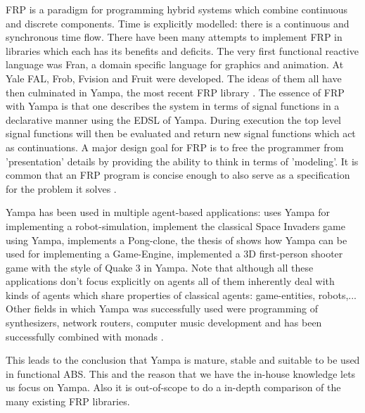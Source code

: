FRP is a paradigm for programming hybrid systems which combine continuous and discrete components. Time is explicitly modelled: there is a continuous and synchronous time flow. There have been many attempts to implement FRP in libraries which each has its benefits and deficits. The very first functional reactive language was Fran, a domain specific language for graphics and animation. At Yale FAL, Frob, Fvision and Fruit were developed. The ideas of them all have then culminated in Yampa, the most recent FRP library \cite{nilsson_functional_2002}. The essence of FRP with Yampa is that one describes the system in terms of signal functions in a declarative manner using the EDSL of Yampa. During execution the top level signal functions will then be evaluated and return new signal functions which act as continuations. A major design goal for FRP is to free the programmer from 'presentation' details by providing the ability to think in terms of 'modeling'. It is common that an FRP program is concise enough to also serve as a specification for the problem it solves \cite{wan_functional_2000}.

Yampa has been used in multiple agent-based applications: \cite{hudak_arrows_2003} uses Yampa for implementing a robot-simulation, \cite{courtney_yampa_2003} implement the classical Space Invaders game using Yampa, \cite{nilsson_declarative_2014} implements a Pong-clone, the thesis of \cite{meisinger_game-engine-architektur_2010} shows how Yampa can be used for implementing a Game-Engine, \cite{mun_hon_functional_2005} implemented a 3D first-person shooter game with the style of Quake 3 in Yampa. Note that although all these applications don't focus explicitly on agents all of them inherently deal with kinds of agents which share properties of classical agents: game-entities, robots,... Other fields in which Yampa was successfully used were programming of synthesizers, network routers, computer music development and has been successfully combined with monads \cite{perez_functional_2016}.

This leads to the conclusion that Yampa is mature, stable and suitable to be used in functional ABS. This and the reason that we have the in-house knowledge lets us focus on Yampa. Also it is out-of-scope to do a in-depth comparison of the many existing FRP libraries.

